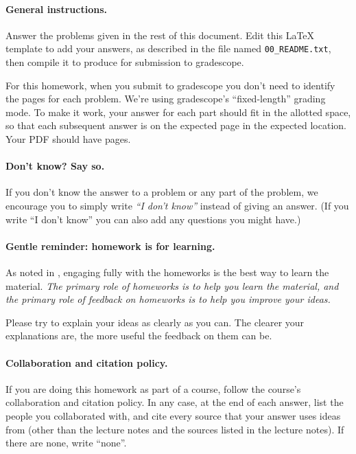 

\paragraph{General instructions.}
Answer the problems given in the rest of this document.
Edit this LaTeX template to add your answers, as described in the file named \texttt{00\_README.txt},
then compile it to produce \ifGradescope{} for submission to gradescope\fi.

\ifGradescope
For this homework, when you submit to gradescope you don't need to identify the pages
for each problem.  We're using gradescope's ``fixed-length'' grading mode.
To make it work, your answer for each part should fit in the allotted space,
so that each subsequent answer is on the expected page in the expected location.
Your PDF should have
pages.  
\fi

\paragraph{Don't know?  Say so.}
If you don't know the answer to a problem or any part of the problem,
we encourage you to simply write \emph{``I don't know''} instead of giving an answer.
(If you write ``I don't know'' you can also add any questions you might have.)

\paragraph{Gentle reminder: homework is for learning.}
As noted in , engaging fully with the homeworks is the best way to learn the material.
\emph{The primary role of homeworks is to help you learn the material,
  and the primary role of feedback on homeworks is to help you improve your ideas.}

Please try to explain your ideas as clearly as you can.
The clearer your explanations are, the more useful the feedback on them can be.

\paragraph{Collaboration and citation policy.}
If you are doing this homework as part of a course, follow the course's collaboration and citation policy.
In any case, at the end of each answer, list the people you collaborated with,
and cite every source that your answer uses ideas from
(other than the lecture notes and the sources listed in the lecture notes).
If there are none, write ``none''.


\vfill
\noindent{\footnotesize\copyrightNotice}

